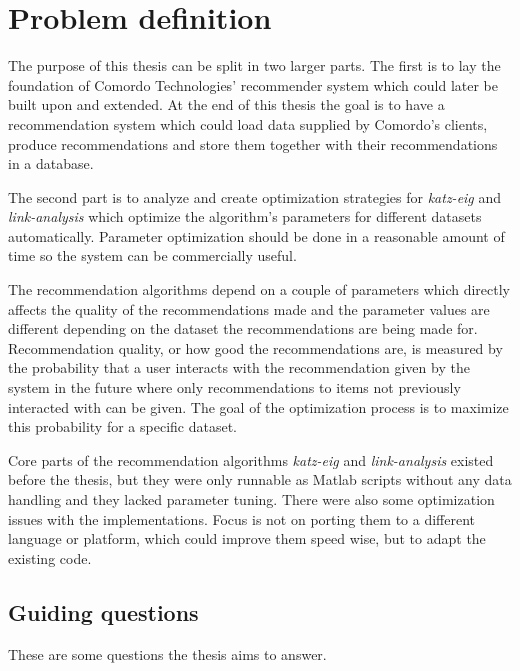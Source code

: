 
\section{Problem definition}\label{sec:intro:problem}

The purpose of this thesis can be split in two larger parts. The first is to lay the foundation of Comordo Technologies' recommender system which could later be built upon and extended. At the end of this thesis the goal is to have a recommendation system which could load data supplied by Comordo's clients, produce recommendations and store them together with their recommendations in a database.

The second part is to analyze and create optimization strategies for \textit{katz-eig} and \textit{link-analysis} which optimize the algorithm's parameters for different datasets automatically. Parameter optimization should be done in a reasonable amount of time so the system can be commercially useful.

The recommendation algorithms depend on a couple of parameters which directly affects the quality of the recommendations made and the parameter values are different depending on the dataset the recommendations are being made for.  Recommendation quality, or how good the recommendations are, is measured by the probability that a user interacts with the recommendation given by the system in the future where only recommendations to items not previously interacted with can be given. The goal of the optimization process is to maximize this probability for a specific dataset.

Core parts of the recommendation algorithms \textit{katz-eig} and \textit{link-analysis} existed before the thesis, but they were only runnable as Matlab scripts without any data handling and they lacked parameter tuning. There were also some optimization issues with the implementations. Focus is not on porting them to a different language or platform, which could improve them speed wise, but to adapt the existing code.

\newpage
\subsection{Guiding questions}\label{sec:intro:questions}

These are some questions the thesis aims to answer.

